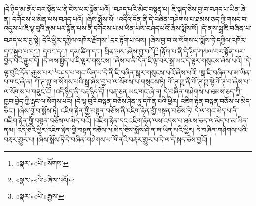 །དེ་ཉིད་མ་ནོར་བར་སྟོན་པ་ནི་ངེས་པར་སྟོན་པའོ། །བཤད་པའི་མིང་བསྟན་པ། ཇི་སྐད་ཅེས་བྱ་བ་བཤད་པ་ཡིན་ཞེ་ན། དགོངས་པ་མིན་པས་བཤད་པའོ། །ཞེས་སྨོས་སོ། །འདིའི་དོན་ནི་དེ་བཞིན་གཤེགས་པ་ཐམས་ཅད་ཀྱི་གསང་བ་འདུས་པ་ཇི་ལྟ་བུའི་རྣམ་པར་སྟོན་པས་ནི་དགོངས་པ་མ་ཡིན་པས་བཤད་པའོ་ཞེས་སྨོས་སོ། །དེ་ནས་སྒྲ་ཇི་བཞིན་པ་བཤད་པར་བྱ་སྟེ། དེའི་ཕྱིར་དཀྱིལ་འཁོར་རྫོགས་\footnote{«སྣར་»«པེ་»སོགས་}དང་རྟོག་པ་ལས། །ཞེས་བྱ་བ་ལ་སོགས་པ་སྨོས་ཏེ་དཀྱིལ་འཁོར་དང་སྒྲུབ་པ་དང་། དབང་དང་། དམ་ཚིག་དང་། ཕྲིན་ལས་:ཞེས་བྱ་བའོ།\footnote{«སྣར་»«པེ་»ཞེས་པའོ།} །རྟོག་པ་ནི་དེ་ཉིད་གསལ་བར་སྟོན་པར་བྱེད་པའི་རྒྱུད་དོ། །དེ་ལས་སྤྱོད་པ་ཇི་ལྟར་གསུངས། །ཞེས་པ་ནི་དོན་ཇི་ལྟ་བར་སྒྲ་ཡང་དེ་ལྟར་གསུངས་ཞེས་པའོ། །དེ་ལྟ་བུའི་དོན་:རྒྱས་པར་\footnote{«སྣར་»«པེ་»རྒྱས་}བཤད་པ་གང་ཡིན་པ་དེ་ནི་ཇི་བཞིན་སྒྲར་གསུངས་པའོ་ཞེས་པའོ། །སྒྲ་ཇི་བཞིན་པ་མ་ཡིན་པ་གང་ཞེ་ན། ཀོ་ཊ་ཀྵ་ལ་སོགས་པའི་སྒྲ་ཞེས་བྱ་བ་ལ་སོགས་པ་གསུངས་ཏེ། ཀོ་ཊ་ཀྵ་ནི་ཀོ་ཊ་ཀྵ་སྟེ་ཀོ་ཊ་བ་ཞེས་པ་ལ་སོགས་པ་གཟུང་ངོ། །འདི་ཉིད་ནི་བརྡ་ཉིད་དོ། །བརྡ་ཅན་ཡང་གང་ཞེ་ན། དེ་བཞིན་གཤེགས་པ་ཐམས་ཅད་ཀྱི་ཁྱབ་བྱེད་ཀྱི་རླུང་ལ་སོགས་པའོ། །དེ་ལྟ་བུའི་བསྟན་བཅོས་ཤིན་ཏུ་དཀོན་པའི་ཕྱིར། འཇིག་རྟེན་བསྟན་བཅོས་ལ་མེད་ཅིང་། །ཞེས་བྱ་བ་སྨོས་ཏེ། འཇིག་རྟེན་གྱི་བསྟན་བཅོས་ནི་འཇིག་རྟེན་གྱི་བསྟན་བཅོས་ཏེ། དེ་ལ་གང་མེད་པ་ནི་འཇིག་རྟེན་གྱི་བསྟན་བཅོས་ལ་མེད་པའོ། །འཇིག་རྟེན་དང་འཇིག་རྟེན་ལས་འདས་པ་ཐམས་ཅད་ལ་མེད་པ་མ་ཡིན་ནམ། འདི་ཅིའི་ཕྱིར་འཇིག་རྟེན་གྱི་བསྟན་བཅོས་ལ་མེད་ཅེས་སྨོས་ཤེ་ན་མ་ཡིན་པའི་ཕྱིར། དེ་བཞིན་གཤེགས་པའི་བརྡར་གྱུར་པ། །ཞེས་སྨོས་ཏེ་དེ་བཞིན་གཤེགས་པ་ཁོ་ནའི་བརྡར་གྱུར་པ་དེ་ལ་དེ་སྐད་ཅེས་བྱའོ། །
